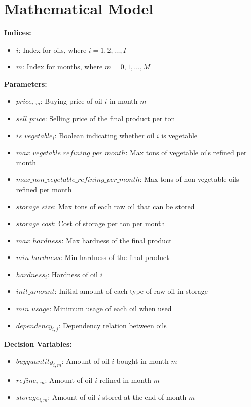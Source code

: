 \documentclass{article}
\begin{document}
\section*{Mathematical Model}

\textbf{Indices:}
\begin{itemize}
    \item $i$: Index for oils, where $i = 1, 2, \ldots, I$
    \item $m$: Index for months, where $m = 0, 1, \ldots, M$
\end{itemize}

\textbf{Parameters:}
\begin{itemize}
    \item $price_{i,m}$: Buying price of oil $i$ in month $m$
    \item $sell\_price$: Selling price of the final product per ton
    \item $is\_vegetable_{i}$: Boolean indicating whether oil $i$ is vegetable
    \item $max\_vegetable\_refining\_per\_month$: Max tons of vegetable oils refined per month
    \item $max\_non\_vegetable\_refining\_per\_month$: Max tons of non-vegetable oils refined per month
    \item $storage\_size$: Max tons of each raw oil that can be stored
    \item $storage\_cost$: Cost of storage per ton per month
    \item $max\_hardness$: Max hardness of the final product
    \item $min\_hardness$: Min hardness of the final product
    \item $hardness_{i}$: Hardness of oil $i$
    \item $init\_amount$: Initial amount of each type of raw oil in storage
    \item $min\_usage$: Minimum usage of each oil when used
    \item $dependency_{i,j}$: Dependency relation between oils
\end{itemize}

\textbf{Decision Variables:}
\begin{itemize}
    \item $buyquantity_{i,m}$: Amount of oil $i$ bought in month $m$
    \item $refine_{i,m}$: Amount of oil $i$ refined in month $m$
    \item $storage_{i,m}$: Amount of oil $i$ stored at the end of month $m$
\end{itemize}
\end{document}
